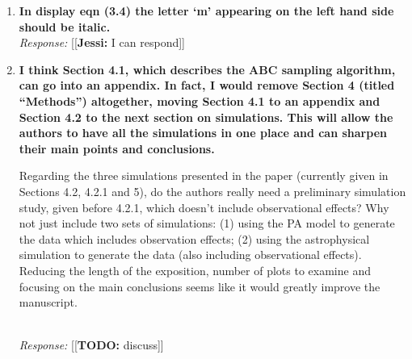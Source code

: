 \documentclass[11pt, oneside]{article}   	%
\newcommand{\jessi}[1]{{\color{blue}[[\textbf{Jessi: }#1]]}}
\newcommand{\todo}[1]{{\color{red}[[\textbf{TODO: }#1]]}}
\begin{document}
\begin{enumerate}
{This statement confuses me a bit. It seems to suggest that we only observe the initial formation of star clusters. I would expect the opposite, i.e. that the star clusters we observe are a mix of old and new clusters that have developed over different time ranges. Perhaps the authors are getting at a selection effect where the old star clusters are more dim and are effectively censored due to the sensitivity of our instruments. Either way, this paragraph could use some cleaning up.} \\
\noindent \emph{Response:} \jessi{I can respond}
\bigskip

\item {\bf In display eqn (3.4) the letter `m' appearing on the left hand side should be italic.} \\
\noindent \emph{Response:} \jessi{I can respond}
\bigskip

\item {\bf I think Section 4.1, which describes the ABC sampling algorithm, can go into an appendix. In fact, I would remove Section 4 (titled ``Methods'') altogether, moving Section 4.1 to an appendix and Section 4.2 to the next section on simulations. This will allow the authors to have all the simulations in one place and can sharpen their main points and conclusions.

Regarding the three simulations presented in the paper (currently given in Sections 4.2, 4.2.1 and 5), do the authors really need a preliminary simulation study, given before 4.2.1, which doesn't include observational effects? Why not just include two sets of simulations: (1) using the PA model to generate the data which includes observation effects; (2) using the astrophysical simulation to generate the data (also including observational effects). Reducing the length of the exposition, number of plots to examine and focusing on the main conclusions seems like it would greatly improve the manuscript.
}\\
\noindent \emph{Response:} \todo{discuss}
\bigskip
\end{enumerate}
\end{document}
